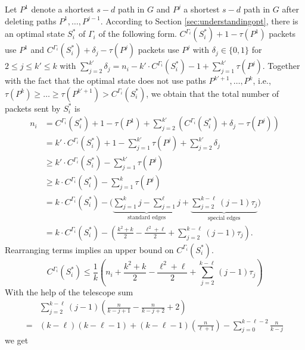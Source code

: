 Let $P^1$ denote a shortest $s-d$ path in $G$ and $P^j$ a shortest $s-d$ path in $G$ after deleting paths $P^1, \dots, P^{j-1}$. According to Section \ref{sec:understandingopt}, there is an optimal state $S^*_i$ of $\Gamma_i$ of the following form. $C^{\Gamma_i}(S^*_i)+1-\tau(P^1)$ packets use $P^1$ and $C^{\Gamma_i}(S^*_i)+\delta_j -\tau(P^j)$ packets use $P^j$ with $\delta_j\in\{0,1\}$ for \mbox{$2\leq j \leq k'\leq k$} with \mbox{$\sum_{j=2}^{k'} \delta_j$}$ = $\mbox{$n_i-k'\cdot C^{\Gamma_i}(S^*_i) -1 +\sum_{j=1}^{k'} \tau(P^j)$}. 
Together with the fact that the optimal state does not use paths $P^{k'+1}, \dots, P^k$, i.e., $\tau(P^k)\geq \dots \geq \tau(P^{k'+1}) > C^{\Gamma_i}(S^*_i)$, we obtain that the total number of packets sent by $S^*_i$ is
\begin{align*}
    n_i &= C^{\Gamma_i}(S^*_i)+1-\tau(P^1) + \sum_{j=2}^{k'} \left(C^{\Gamma_i}(S^*_i)+\delta_j -\tau(P^j)\right)\nonumber\\
    &= k'\cdot C^{\Gamma_i}(S^*_i)+1-\sum_{j=1}^{k'}\tau(P^j) + \sum_{j=2}^{k'} \delta_j \\
    &\geq k'\cdot C^{\Gamma_i}(S^*_i)-\sum_{j=1}^{k'}\tau(P^j)\nonumber\\
    &\geq k\cdot C^{\Gamma_i}(S^*_i)-\sum_{j=1}^{k}\tau(P^j)  \\
    &= k \cdot C^{\Gamma_i}(S^*_i)-  \Biggl(\underbrace{\sum\limits_{j=1}^k j - \sum\limits_{j=1}^{\ell} j }_{\text{standard edges}}+ \underbrace{\sum\limits_{j=2}^{k-\ell} (j-1)\tau_j}_{\text{special edges}}\Biggr)\nonumber\\
    &= k\cdot C^{\Gamma_i}(S^*_i) - \left(\frac{k^2+k}{2} - \frac{\ell^2+\ell}{2} + \sum\limits_{j=2}^{k-\ell} (j-1)\tau_j\right).%
\end{align*}
Rearranging terms implies an upper bound on $C^{\Gamma_i}(S^*_i)$.
\[C^{\Gamma_i}(S^*_i)\leq \frac{1}{k}\left(n_i+\frac{k^2+k}{2} - \frac{\ell^2+\ell}{2} +\sum\limits_{j=2}^{k-\ell} (j-1)\tau_j\right)\]
%
With the help of the telescope sum 
\begin{align*}
    &\sum\limits_{j=2}^{k-\ell} (j-1)\left( \frac{n}{k-j+1} -  \frac{n}{k-j+2}+2\right) \nonumber\\
    = & (k-\ell)(k-\ell-1) + (k-\ell-1)\left( \frac{n}{\ell+1}\right) - \sum_{j=0}^{k-\ell-2} \frac{n}{k-j}%
\end{align*}
we get
